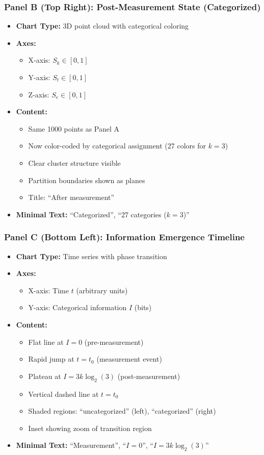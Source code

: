 \subsubsection*{Panel B (Top Right): Post-Measurement State (Categorized)}
\begin{itemize}
\item \textbf{Chart Type:} 3D point cloud with categorical coloring
\item \textbf{Axes:}
  \begin{itemize}
  \item X-axis: $S_k \in [0,1]$
  \item Y-axis: $S_t \in [0,1]$
  \item Z-axis: $S_e \in [0,1]$
  \end{itemize}
\item \textbf{Content:}
  \begin{itemize}
  \item Same 1000 points as Panel A
  \item Now color-coded by categorical assignment (27 colors for $k=3$)
  \item Clear cluster structure visible
  \item Partition boundaries shown as planes
  \item Title: ``After measurement''
  \end{itemize}
\item \textbf{Minimal Text:} ``Categorized'', ``27 categories ($k=3$)''
\end{itemize}

\subsubsection*{Panel C (Bottom Left): Information Emergence Timeline}
\begin{itemize}
\item \textbf{Chart Type:} Time series with phase transition
\item \textbf{Axes:}
  \begin{itemize}
  \item X-axis: Time $t$ (arbitrary units)
  \item Y-axis: Categorical information $I$ (bits)
  \end{itemize}
\item \textbf{Content:}
  \begin{itemize}
  \item Flat line at $I=0$ (pre-measurement)
  \item Rapid jump at $t=t_0$ (measurement event)
  \item Plateau at $I=3k \log_2(3)$ (post-measurement)
  \item Vertical dashed line at $t=t_0$
  \item Shaded regions: ``uncategorized'' (left), ``categorized'' (right)
  \item Inset showing zoom of transition region
  \end{itemize}
\item \textbf{Minimal Text:} ``Measurement'', ``$I = 0$'', ``$I = 3k \log_2(3)$''
\end{itemize}


